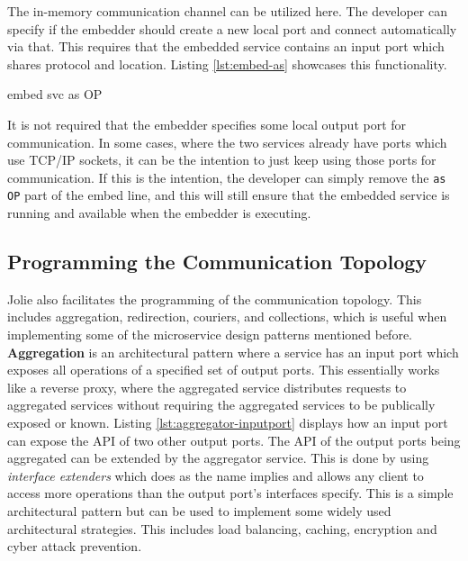The in-memory communication channel can be utilized here. The developer can specify if the embedder should create a new local port and connect automatically via that. This requires that the embedded service contains an input port which shares protocol and location.
Listing \ref*{lst:embed-as} showcases this functionality.

\begin{jolisting}[][caption={Embedding of a service called "svc" via a local output port "OP"}, label=lst:embed-as]
embed svc as OP
\end{jolisting}

It is not required that the embedder specifies some local output port for communication. In some cases, where the two services already have ports which use TCP/IP sockets, 
it can be the intention to just keep using those ports for communication. If this
is the intention, the developer can simply remove the \texttt{as OP} part of the embed line, and this will still ensure that the embedded service is running and available when the embedder is executing.


\subsection{Programming the Communication Topology}
Jolie also facilitates the programming of the communication topology. This includes aggregation, redirection, couriers, and collections, which is useful when 
implementing some of the microservice design patterns mentioned before.
\newline\newline
\textbf{Aggregation} is an architectural pattern where a service has an input port which exposes all operations of a specified set of output ports. This essentially works like a reverse proxy, where the aggregated service distributes requests to aggregated services without
requiring the aggregated services to be publically exposed or known. Listing \ref{lst:aggregator-inputport} displays how an input port can expose the API of two other output ports.
The API of the output ports being aggregated can be extended by the aggregator service. This is done by using \textit{interface extenders} which does as the name implies and allows any client to access more operations than the output port's interfaces specify.
This is a simple architectural pattern but can be used to implement some widely used architectural strategies. This includes load balancing, caching, encryption and cyber attack prevention.

